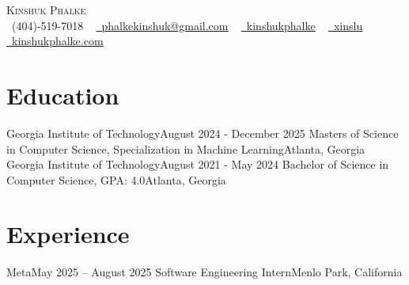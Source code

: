 \begin{center}
    {\Huge \scshape Kinshuk Phalke} \\ \vspace{5pt}
    \small \raisebox{-0.1\height}\faPhone\ (404)-519-7018 ~ \href{mailto:phalkekinshuk@gmail.com}{\raisebox{-0.2\height}\faEnvelope\  \underline{phalkekinshuk@gmail.com}} ~ 
    \href{https://linkedin.com/in/kinshukphalke/}{\raisebox{-0.2\height}\faLinkedin\ \underline{kinshukphalke}}  ~
    \href{https://github.com/xinslu}{\raisebox{-0.2\height}\faGithub\ \underline{xinslu}} ~
    \href{https://kinshukphalke.com/}{\raisebox{-0.2\height}\faLink\ \underline{kinshukphalke.com}}
    \vspace{-8pt}
\end{center}


\section{Education}
  \resumeSubHeadingListStart
    \resumeSubheading
      {Georgia Institute of Technology}{August 2024 - December 2025}
      {Masters of Science in Computer Science, Specialization in Machine Learning}{Atlanta, Georgia}
  \resumeSubHeadingListEnd
\vspace{-5pt}
  \resumeSubHeadingListStart
    \resumeSubheading
      {Georgia Institute of Technology}{August 2021 - May 2024}
      {Bachelor of Science in Computer Science, GPA: 4.0}{Atlanta, Georgia}
    \resumeItemListStart
    \resumeItemListEnd
  \resumeSubHeadingListEnd

  \vspace{-16pt}


\section{Experience}

  \resumeSubHeadingListStart

    \resumeSubheading
      {Meta}{May 2025 -- August 2025}
      {Software Engineering Intern}{Menlo Park, California}
      \resumeItemListStart
      \resumeItemListEnd

